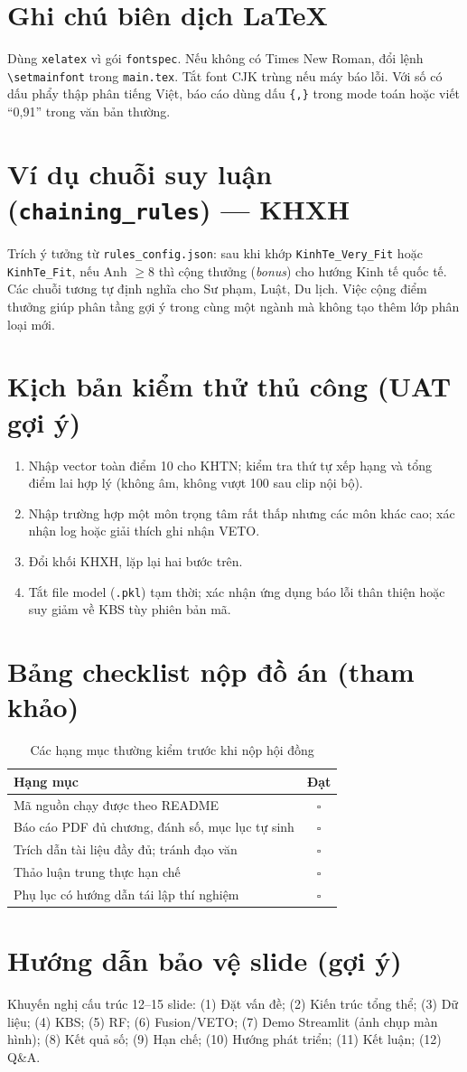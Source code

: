 \section{Ghi chú biên dịch \LaTeX}
Dùng \texttt{xelatex} vì gói \texttt{fontspec}. Nếu không có Times New Roman, đổi lệnh \texttt{\textbackslash setmainfont} trong \texttt{main.tex}. Tắt font CJK trùng nếu máy báo lỗi. Với số có dấu phẩy thập phân tiếng Việt, báo cáo dùng dấu \texttt{\{,\}} trong mode toán hoặc viết ``0{,}91'' trong văn bản thường.

\section{Ví dụ chuỗi suy luận (\texttt{chaining\_rules}) --- KHXH}
Trích ý tưởng từ \texttt{rules\_config.json}: sau khi khớp \texttt{KinhTe\_Very\_Fit} hoặc \texttt{KinhTe\_Fit}, nếu Anh $\geq 8$ thì cộng thưởng (\textit{bonus}) cho hướng Kinh tế quốc tế. Các chuỗi tương tự định nghĩa cho Sư phạm, Luật, Du lịch. Việc cộng điểm thưởng giúp phân tầng gợi ý trong cùng một ngành mà không tạo thêm lớp phân loại mới.

\section{Kịch bản kiểm thử thủ công (UAT gợi ý)}
\begin{enumerate}[leftmargin=*]
  \item Nhập vector toàn điểm 10 cho KHTN; kiểm tra thứ tự xếp hạng và tổng điểm lai hợp lý (không âm, không vượt 100 sau clip nội bộ).
  \item Nhập trường hợp một môn trọng tâm rất thấp nhưng các môn khác cao; xác nhận log hoặc giải thích ghi nhận VETO.
  \item Đổi khối KHXH, lặp lại hai bước trên.
  \item Tắt file model (\texttt{.pkl}) tạm thời; xác nhận ứng dụng báo lỗi thân thiện hoặc suy giảm về KBS tùy phiên bản mã.
\end{enumerate}

\section{Bảng checklist nộp đồ án (tham khảo)}
\begin{table}[htbp]
\centering
\caption{Các hạng mục thường kiểm trước khi nộp hội đồng}
\begin{tabular}{p{7cm}c}
\toprule
Hạng mục & Đạt \\
\midrule
Mã nguồn chạy được theo README & $\square$ \\
Báo cáo PDF đủ chương, đánh số, mục lục tự sinh & $\square$ \\
Trích dẫn tài liệu đầy đủ; tránh đạo văn & $\square$ \\
Thảo luận trung thực hạn chế & $\square$ \\
Phụ lục có hướng dẫn tái lập thí nghiệm & $\square$ \\
\bottomrule
\end{tabular}
\end{table}

\section{Hướng dẫn bảo vệ slide (gợi ý)}
Khuyến nghị cấu trúc 12--15 slide: (1) Đặt vấn đề; (2) Kiến trúc tổng thể; (3) Dữ liệu; (4) KBS; (5) RF; (6) Fusion/VETO; (7) Demo Streamlit (ảnh chụp màn hình); (8) Kết quả số; (9) Hạn chế; (10) Hướng phát triển; (11) Kết luận; (12) Q\&A.
